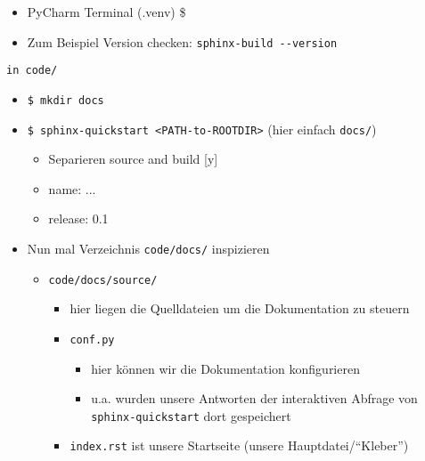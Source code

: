 \begin{itemize}
	\item
	      PyCharm Terminal (.venv) \$
	\item
	      Zum Beispiel Version checken: \texttt{sphinx-build\ -\/-version}
\end{itemize}
%
\texttt{in \texttt{code/}}
\begin{itemize}
	\item \texttt{\$ mkdir docs}
	\item \texttt{\$ sphinx-quickstart\ \textless{}PATH-to-ROOTDIR\textgreater{}}
	      (hier einfach \texttt{docs/})
	      \begin{itemize}
		      \item Separieren source and build [y]
		      \item name: ...
		      \item release: 0.1
	      \end{itemize}
	\item Nun mal	Verzeichnis \texttt{code/docs/} inspizieren
	      \begin{itemize}

		      \item
		            \texttt{code/docs/source/}
		            \begin{itemize}

			            \item
			                  hier liegen die Quelldateien um die Dokumentation zu steuern
			            \item
			                  \texttt{conf.py}

			                  \begin{itemize}

				                  \item
				                        hier können wir die Dokumentation konfigurieren
				                  \item
				                        u.a. wurden unsere Antworten der interaktiven Abfrage von \texttt{sphinx-quickstart} dort gespeichert
			                  \end{itemize}
			            \item
			                  \texttt{index.rst} ist unsere Startseite (unsere Hauptdatei/``Kleber'')
			                  \begin{itemize}


\end{itemize}
\end{itemize}
\end{itemize}
\end{itemize}
